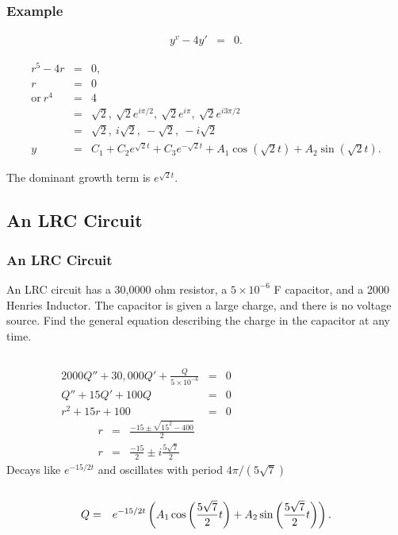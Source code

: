 \begin{frame}
  \frametitle{Example}

  \begin{eqnarray*}
    y^v - 4 y'& = & 0.
  \end{eqnarray*}

  {
    \begin{eqnarray*}
      r^5 - 4r & = & 0, \\
      r & = & 0 \\
      \mathrm{or~} r^4 & = & 4 \\
      & = & \sqrt{2},~\sqrt{2}e^{i \pi/2}, ~ \sqrt{2}e^{i \pi},~ \sqrt{2}e^{i 3\pi/2} \\
      & = & \sqrt{2},~i\sqrt{2},~-\sqrt{2},~-i\sqrt{2} \\
      y & = & C_1 + C_2 e^{\sqrt{2}t} + C_3 e^{-\sqrt{2}t} +
      A_1 \cos(\sqrt{2}t) + A_2 \sin(\sqrt{2}t).
    \end{eqnarray*}
  }

  {
    The dominant growth term is $e^{\sqrt{2}t}$. 
  }

\end{frame}

\subsection{An LRC Circuit}

\begin{frame}
  \frametitle{An LRC Circuit}

  An LRC circuit has a 30,0000 ohm resistor, a $5\times 10^{-6}$ F
  capacitor, and a 2000 Henries Inductor. The capacitor is given a
  large charge, and there is no voltage source. Find the general
  equation describing the charge in the capacitor at any time.

  \begin{columns}
     


     {
      \begin{eqnarray*}
        2000 Q'' + 30,000 Q' + \frac{Q}{5\times 10^{-6}} & = & 0 \\
        Q'' + 15 Q' + 100 Q & = & 0 \\
        r^2 + 15 r + 100 & = & 0
      \end{eqnarray*}
    }
     {
      \begin{eqnarray*}
        r & = & \frac{-15\pm\sqrt{15^2-400}}{2} \\
        r & = & \frac{-15}{2} \pm i\frac{5\sqrt{7}}{2} 
      \end{eqnarray*}
    }
     {
      Decays like $e^{-15/2 t}$ and oscillates with period $4\pi/(5\sqrt{7})$
    }
  \end{columns}

     {
      \begin{eqnarray*}
        Q & = & e^{-15/2 t}
        \left( A_1 \cos\left( \frac{5\sqrt{7}}{2} t\right) + 
            A_2 \sin\left( \frac{5\sqrt{7}}{2} t \right) \right).
      \end{eqnarray*}
    }

\end{frame}

